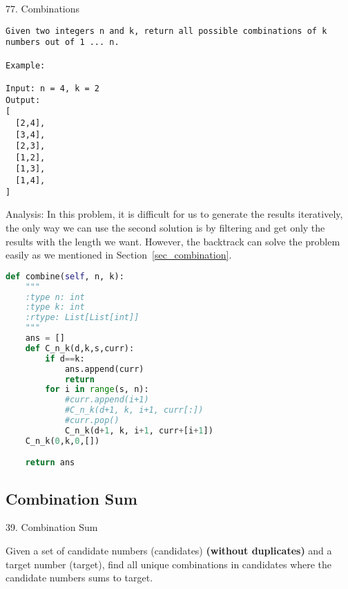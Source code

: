 \documentclass[../main.tex]{subfiles}
\begin{document}
77. Combinations
\begin{lstlisting}
Given two integers n and k, return all possible combinations of k numbers out of 1 ... n.

Example:

Input: n = 4, k = 2
Output:
[
  [2,4],
  [3,4],
  [2,3],
  [1,2],
  [1,3],
  [1,4],
]
\end{lstlisting}
Analysis: In this problem, it is difficult for us to generate the results iteratively, the only way we can use the second solution is by filtering and get only the results with the length we want. However, the backtrack can solve the problem easily as we mentioned in Section~\ref{sec_combination}.
\begin{lstlisting}[language=Python]
def combine(self, n, k):
    """
    :type n: int
    :type k: int
    :rtype: List[List[int]]
    """
    ans = []
    def C_n_k(d,k,s,curr):
        if d==k:
            ans.append(curr)
            return
        for i in range(s, n):
            #curr.append(i+1)
            #C_n_k(d+1, k, i+1, curr[:])
            #curr.pop()
            C_n_k(d+1, k, i+1, curr+[i+1])
    C_n_k(0,k,0,[]) 

    return ans
\end{lstlisting}
\subsection{Combination Sum}
39. Combination Sum

Given a set of candidate numbers (candidates) \textbf{(without duplicates)} and a target number (target), find all unique combinations in candidates where the candidate numbers sums to target.
\end{document}
